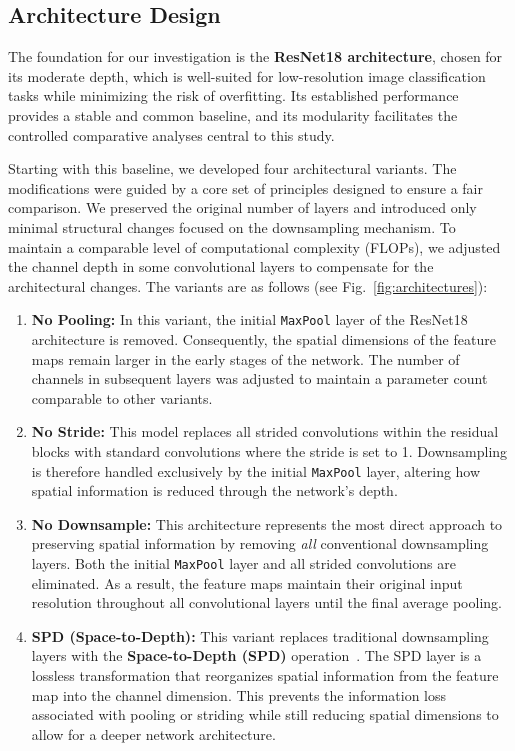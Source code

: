\documentclass[conference]{IEEEtran}
\begin{document}
\subsection{Architecture Design}\label{subsec:architecture}
The foundation for our investigation is the \textbf{ResNet18 architecture}, chosen for its moderate depth, which is well-suited for low-resolution image classification tasks while minimizing the risk of overfitting. Its established performance provides a stable and common baseline, and its modularity facilitates the controlled comparative analyses central to this study.

Starting with this baseline, we developed four architectural variants. The modifications were guided by a core set of principles designed to ensure a fair comparison. We preserved the original number of layers and introduced only minimal structural changes focused on the downsampling mechanism. To maintain a comparable level of computational complexity (FLOPs), we adjusted the channel depth in some convolutional layers to compensate for the architectural changes. The variants are as follows (see Fig.~\ref{fig:architectures}):

\begin{enumerate}
    \item \textbf{No Pooling:} In this variant, the initial \texttt{MaxPool} layer of the ResNet18 architecture is removed. Consequently, the spatial dimensions of the feature maps remain larger in the early stages of the network. The number of channels in subsequent layers was adjusted to maintain a parameter count comparable to other variants.

    \item \textbf{No Stride:} This model replaces all strided convolutions within the residual blocks with standard convolutions where the stride is set to 1. Downsampling is therefore handled exclusively by the initial \texttt{MaxPool} layer, altering how spatial information is reduced through the network's depth.

    \item \textbf{No Downsample:} This architecture represents the most direct approach to preserving spatial information by removing \textit{all} conventional downsampling layers. Both the initial \texttt{MaxPool} layer and all strided convolutions are eliminated. As a result, the feature maps maintain their original input resolution throughout all convolutional layers until the final average pooling.

    \item \textbf{SPD (Space-to-Depth):} This variant replaces traditional downsampling layers with the \textbf{Space-to-Depth (SPD)} operation~\cite{sunkara2022}. The SPD layer is a lossless transformation that reorganizes spatial information from the feature map into the channel dimension. This prevents the information loss associated with pooling or striding while still reducing spatial dimensions to allow for a deeper network architecture.
\end{enumerate}
\end{document}

